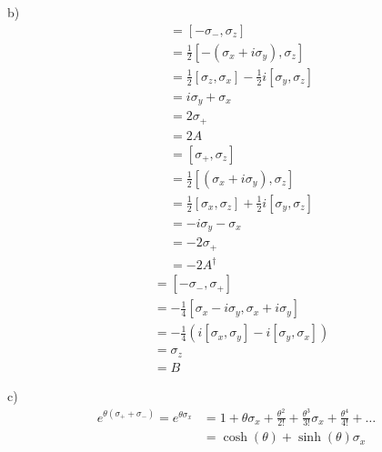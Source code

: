 \begin{homeworkProblem}[Problem 7]
\begin{homeworkSection}{b)}
   \newcommand\Aop{\ensuremath{-\sigma_{-}}}
   \newcommand\Adaggerop{\ensuremath{\sigma_{+}}}
   \newcommand\Bop{\ensuremath{\sigma_{z}}}
   \begin{align}
      [A, B] &= [\Aop, \Bop] \\
             &= \frac{1}{2} [- \left( \sigma_{x} + i \sigma_{y} \right), \sigma_{z}] \\
             &= \frac{1}{2}[\sigma_{z}, \sigma_{x}] - \frac{1}{2}i [\sigma_{y}, \sigma_{z}] \\
             &= i \sigma_{y} + \sigma_{x} \\
             &= 2 \sigma_{+} \\
             &= 2 A
   \end{align}
   \begin{align}
      [A^{\dagger}, B] &= [\Adaggerop, \Bop] \\
             &= \frac{1}{2} [\left( \sigma_{x} + i \sigma_{y} \right), \sigma_{z}] \\
             &= \frac{1}{2}[\sigma_{x}, \sigma_{z}] + \frac{1}{2}i [\sigma_{y}, \sigma_{z}] \\
             &= -i \sigma_{y} - \sigma_{x} \\
             &= -2 \sigma_{+} \\
             &= -2 A^{\dagger}
   \end{align}
   \begin{align}
      [A, A^{\dagger}] &= [\Aop, \Adaggerop] \\
                       &= -\frac{1}{4} [\sigma_{x} - i\sigma_{y}, \sigma_{x} + i
      \sigma_{y}] \\
      &= -\frac{1}{4} \left( i[\sigma_{x}, \sigma_{y}] -
      i[\sigma_{y}, \sigma_{x} ] \right) \\
      &= \sigma_{z} \\
      &= B
   \end{align}
\end{homeworkSection}
\begin{homeworkSection}{c)}
   \begin{align}
      e^{\theta \left( \sigma_{+} + \sigma_{-} \right)}
      = e^{\theta \sigma_{x}}
      &= 1 + \theta \sigma_{x} + \frac{\theta^{2}}{2!} + \frac{\theta^{3}}{3!}
      \sigma_{x} + \frac{\theta^4}{4!} + \ldots \\
      &= \cosh(\theta) + \sinh(\theta) \sigma_{x} \\ \nonumber \\

\end{align}
\end{homeworkSection}
\end{homeworkProblem}

